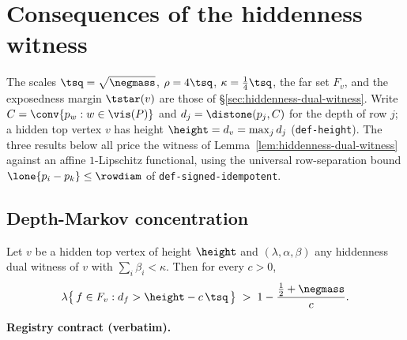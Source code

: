\section{Consequences of the hiddenness witness}\label{sec:witness-consequences}

The scales $\tsq=\sqrt{\negmass}$, $\rho=4\tsq$, $\kappa=\tfrac14\tsq$, the far set $F_v$, and the
exposedness margin $\tstar(v)$ are those of \S\ref{sec:hiddenness-dual-witness}. Write
$C=\conv\{p_w:w\in\vis(P)\}$ and $d_j=\distone(p_j,C)$ for the depth of row $j$; a hidden top vertex $v$
has height $\height=d_v=\max_j d_j$ (\texttt{def-height}). The three results below all price the witness
of Lemma~\ref{lem:hiddenness-dual-witness} against an affine $1$-Lipschitz functional, using the
universal row-separation bound $\lone{p_i-p_k}\le\rowdiam$ of \texttt{def-signed-idempotent}.

\subsection{Depth-Markov concentration}

\begin{lemma}\label{lem:hiddenness-depth-markov}
Let $v$ be a hidden top vertex of height $\height$ and $(\lambda,\alpha,\beta)$ any hiddenness dual
witness of $v$ with $\sum_i\beta_i<\kappa$. Then for every $c>0$,
\begin{equation}\label{eq:wc-markov}
  \lambda\bigl\{\,f\in F_v : d_f> \height-c\,\tsq\,\bigr\}\;>\;1-\frac{\tfrac12+\negmass}{c}.
\end{equation}
\end{lemma}

\noindent\textbf{Registry contract (verbatim).}

